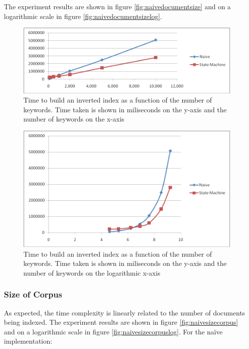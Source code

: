\documentclass[10pt]{report}
\begin{document}
The experiment results are shown in figure \ref{fig:naivedocumentsize}
and on a logarithmic scale in figure \ref{fig:naivedocumentsizelog}.

\begin{figure}
  \begin{center}
    \includegraphics[width=\textwidth,height=!]{naivenumkeywords}
  \end{center}
  \caption{Time to build an inverted index as a function of the
      number of keywords. Time taken is shown in miliseconds on the
      y-axis and the number of keywords on the x-axis}
  \label{fig:naivenumkeywords}
\end{figure} 


\begin{figure}
  \begin{center}
    \includegraphics[width=\textwidth,height=!]{naivenumkeywordslog}
  \end{center}
  \caption{Time to build an inverted index as a function of the
      number of keywords. Time taken is shown in miliseconds on the
      y-axis and the number of keywords on the logarithmic x-axis}
  \label{fig:naivenumkeywordslog}
\end{figure} 


\subsubsection{Size of Corpus}
As expected, the time complexity is linearly related to the number of
documents being indexed. The experiment results are shown in figure
\ref{fig:naivesizecorpus} and on a logarithmic scale in figure
\ref{fig:naivesizecorpuslog}. For the na\"{i}ve implementation:
\end{document}
